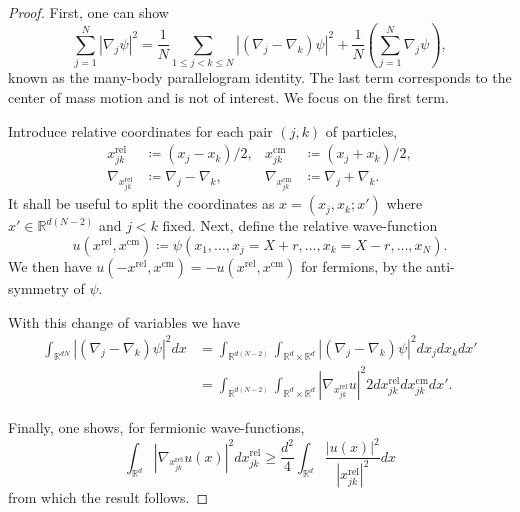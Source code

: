 \begin{proof}
  First, one can show
  \begin{equation}
    \sum_{j=1}^N |\nabla_j \psi|^2 = \frac{1}{N} \sum_{1 \le j < k \le N} \left| (\nabla_j - \nabla_k) \psi \right|^2 + \frac{1}{N} \left( \sum_{j=1}^N \nabla_j \psi \right),
  \end{equation}
  known as the many-body parallelogram identity. The last term corresponds to the center of mass motion and is not of interest. We focus on the first term.

  Introduce relative coordinates for each pair $(j,k)$ of particles,
  \begin{equation}
    \begin{aligned}
      x_{jk}^\text{rel} &\coloneqq (x_j - x_k)/2, & x_{jk}^\text{cm} &\coloneqq (x_j + x_k)/2, \\
      \nabla_{x_{jk}^\text{rel}} &\coloneqq \nabla_j - \nabla_k, & \nabla_{x_{jk}^\text{cm}} &\coloneqq \nabla_j + \nabla_k.
    \end{aligned}
  \end{equation}
  It shall be useful to split the coordinates as $x = (x_j, x_k; x')$ where $x' \in \mathbb{R}^{d(N-2)}$ and $j < k$ fixed. Next, define the relative wave-function
  \begin{equation}
    u(x^\text{rel}, x^\text{cm}) \coloneqq \psi(x_1, \ldots, x_j = X+r, \ldots, x_k = X-r, \ldots, x_N).
  \end{equation}
  We then have $u(-x^\text{rel}, x^\text{cm}) = -u(x^\text{rel}, x^\text{cm})$ for fermions, by the anti-symmetry of $\psi$.

  With this change of variables we have
  \begin{equation}
    \begin{aligned}
      \int_{\mathbb{R}^{dN}} \left|(\nabla_j-\nabla_k)\psi\right|^2 dx
      &= \int_{\mathbb{R}^{d(N-2)}} \int_{\mathbb{R}^d \times \mathbb{R}^d} \left|(\nabla_j-\nabla_k)\psi\right|^2 dx_jdx_kdx' \\
      &= \int_{\mathbb{R}^{d(N-2)}} \int_{\mathbb{R}^d \times \mathbb{R}^d} \left|\nabla_{x_{jk}^\text{rel}}u\right|^2  2 dx_{jk}^\text{rel}dx_{jk}^\text{cm} dx'.
    \end{aligned}
  \end{equation}

  Finally, one shows, for fermionic wave-functions,
  \begin{equation}
    \int_{\mathbb{R}^d} \left|\nabla_{x_{jk}^\text{rel}} u(x) \right|^2 dx_{jk}^\text{rel} \ge \frac{d^2}{4} \int_{\mathbb{R}^d} \frac{|u(x)|^2}{|x_{jk}^\text{rel}|^2} dx
  \end{equation}
  from which the result follows.
\end{proof}

